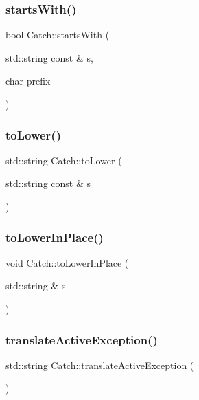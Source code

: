 \subsubsection{\texorpdfstring{starts\+With()}{startsWith()}\hspace{0.1cm}{\footnotesize\ttfamily [2/2]}}
{\footnotesize\ttfamily bool Catch\+::starts\+With (\begin{DoxyParamCaption}\item[{std\+::string const \&}]{s,  }\item[{char}]{prefix }\end{DoxyParamCaption})}

\mbox{\label{namespace_catch_ac036a17412d318598ffda8e1fe7a1177}} 
\subsubsection{\texorpdfstring{to\+Lower()}{toLower()}}
{\footnotesize\ttfamily std\+::string Catch\+::to\+Lower (\begin{DoxyParamCaption}\item[{std\+::string const \&}]{s }\end{DoxyParamCaption})}

\mbox{\label{namespace_catch_a0760dbe87d090a55a35414db57d272c4}} 
\subsubsection{\texorpdfstring{to\+Lower\+In\+Place()}{toLowerInPlace()}}
{\footnotesize\ttfamily void Catch\+::to\+Lower\+In\+Place (\begin{DoxyParamCaption}\item[{std\+::string \&}]{s }\end{DoxyParamCaption})}

\mbox{\label{namespace_catch_adafff91485eeeeb9e9333f317cc0e3b1}} 
\subsubsection{\texorpdfstring{translate\+Active\+Exception()}{translateActiveException()}}
{\footnotesize\ttfamily std\+::string Catch\+::translate\+Active\+Exception (\begin{DoxyParamCaption}{ }\end{DoxyParamCaption})}

